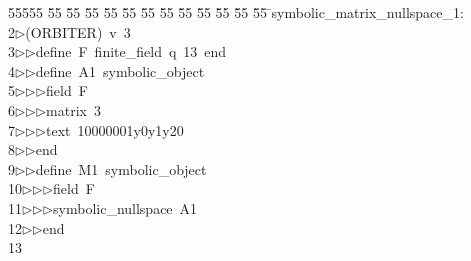 %
%
\begin{tabbing}
55555 \= 55 \= 55 \= 55 \= 55 \= 55 \= 55 \= 55 \= 55 \= 55 \= 55 \= 55 \= 55 \= \>symbolic\_matrix\_nullspace\_1:\\[0pt]
2\>$\triangleright$\>(ORBITER)\ v\ 3\ \\[0pt]
3\>$\triangleright$\>$\triangleright$\>define\ F\ finite\_field\ q\ 13\ end\ \\[0pt]
4\>$\triangleright$\>$\triangleright$\>define\ A1\ symbolic\_object\ \\[0pt]
5\>$\triangleright$\>$\triangleright$\>$\triangleright$\>field\ F\ \\[0pt]
6\>$\triangleright$\>$\triangleright$\>$\triangleright$\>matrix\ 3\ \\[0pt]
7\>$\triangleright$\>$\triangleright$\>$\triangleright$\>text\ 10000001y0y1y20\ \\[0pt]
8\>$\triangleright$\>$\triangleright$\>end\ \\[0pt]
9\>$\triangleright$\>$\triangleright$\>define\ M1\ symbolic\_object\ \\[0pt]
10\>$\triangleright$\>$\triangleright$\>$\triangleright$\>field\ F\ \\[0pt]
11\>$\triangleright$\>$\triangleright$\>$\triangleright$\>symbolic\_nullspace\ A1\ \\[0pt]
12\>$\triangleright$\>$\triangleright$\>end\\[0pt]
13\>\end{tabbing}
